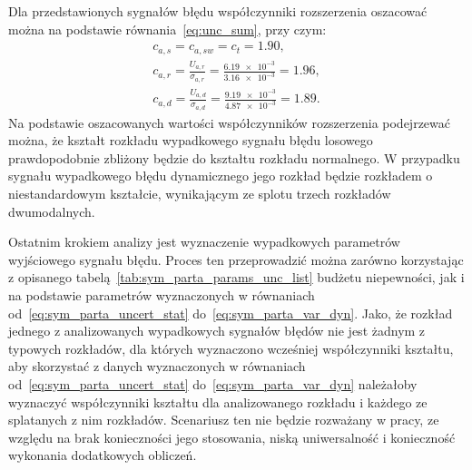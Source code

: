 Dla przedstawionych sygnałów błędu współczynniki rozszerzenia oszacować można na podstawie równania~\eqref{eq:unc_sum}, przy czym:
\begin{gather}
c_{a,s} = c_{a,sw} = c_{t} = 1.90 \label{eq:sym_parta_factor_sta}, \\
c_{a,r} = \frac{U_{a,r}}{\sigma_{a,r}} = \frac{\num{6.19e-3}}{\num{3.16e-3}} = 1.96 \label{eq:sym_parta_factor_rand}, \\
c_{a,d} = \frac{U_{a,d}}{\sigma_{a,d}} = \frac{\num{9.19e-3}}{\num{4.87e-3}} = 1.89 \label{eq:sym_parta_factor_dyn}.
\end{gather}
Na podstawie oszacowanych wartości współczynników rozszerzenia podejrzewać można, że kształt rozkładu wypadkowego sygnału błędu losowego prawdopodobnie zbliżony będzie do kształtu rozkładu normalnego. W przypadku sygnału wypadkowego błędu dynamicznego jego rozkład będzie rozkładem o niestandardowym kształcie, wynikającym ze splotu trzech rozkładów dwumodalnych.

Ostatnim krokiem analizy jest wyznaczenie wypadkowych parametrów wyjściowego sygnału błędu. Proces ten przeprowadzić można zarówno korzystając z opisanego tabelą~\ref{tab:sym_parta_params_unc_list} budżetu niepewności, jak i na podstawie parametrów wyznaczonych w równaniach od~\eqref{eq:sym_parta_uncert_stat} do~\eqref{eq:sym_parta_var_dyn}. Jako, że rozkład jednego z analizowanych wypadkowych sygnałów błędów nie jest żadnym z typowych rozkładów, dla których wyznaczono wcześniej współczynniki kształtu, aby skorzystać z danych wyznaczonych w równaniach od~\eqref{eq:sym_parta_uncert_stat} do~\eqref{eq:sym_parta_var_dyn} należałoby wyznaczyć współczynniki kształtu dla analizowanego rozkładu i każdego ze splatanych z nim rozkładów. Scenariusz ten nie będzie rozważany w pracy, ze względu na brak konieczności jego stosowania, niską uniwersalność i konieczność wykonania dodatkowych obliczeń.


